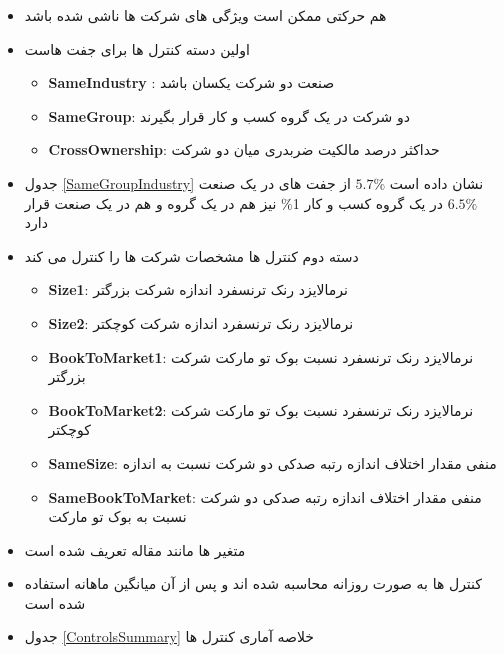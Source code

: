 \begin{itemize}
	\item 
	هم حرکتی ممکن است ویژگی های شرکت ها ناشی شده باشد
	
	\item 
	اولین دسته کنترل ها برای جفت هاست
	\begin{itemize}
		\item 
		\textbf{SameIndustry} :
		صنعت دو شرکت یکسان باشد
		\item 
		\textbf{SameGroup}:
		دو شرکت در یک گروه کسب و کار قرار بگیرند
		\item 
		\textbf{CrossOwnership}:
		حداکثر درصد مالکیت ضربدری میان دو شرکت
		
	\end{itemize}
	\item 
	جدول
	\ref{SameGroupIndustry}
	نشان داده است $5.7 \%$ از جفت های در یک صنعت
	$6.5 \%$ در یک گروه کسب و کار
	1\% نیز هم در یک گروه و هم در یک صنعت قرار دارد
	\item 
	دسته دوم کنترل ها مشخصات شرکت ها را کنترل می کند
	\begin{itemize}
		\item \textbf{Size1}:
		نرمالایزد رنک ترنسفرد اندازه شرکت بزرگتر
		
		
		\item \textbf{Size2}:
		نرمالایزد رنک ترنسفرد اندازه شرکت کوچکتر
		
		\item \textbf{BookToMarket1}:
		نرمالایزد رنک ترنسفرد نسبت بوک تو مارکت شرکت بزرگتر
		
		\item \textbf{BookToMarket2}:
		نرمالایزد رنک ترنسفرد نسبت بوک تو مارکت شرکت کوچکتر
		\item \textbf{SameSize}:
		منفی مقدار اختلاف اندازه رتبه صدکی دو شرکت نسبت به اندازه
		\item  \textbf{SameBookToMarket}:
		منفی مقدار اختلاف اندازه رتبه صدکی دو شرکت نسبت به بوک تو مارکت
	\end{itemize}
	\item 
	متغیر ها مانند مقاله
	تعریف شده است
	\item
	کنترل ها به صورت روزانه محاسبه شده اند و پس از آن میانگین ماهانه استفاده شده است
	\item 
	جدول 
	\ref{ControlsSummary}
	خلاصه آماری کنترل ها
\end{itemize}



\begin{LTR}
\end{LTR}

